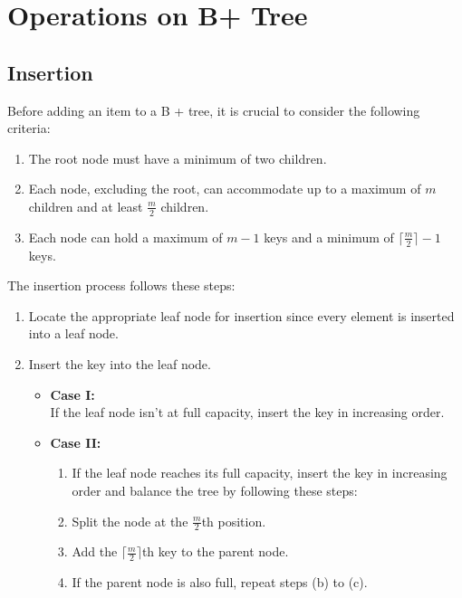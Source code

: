 \documentclass{article}
\begin{document}
\section{Operations on B+ Tree}
    \subsection{Insertion }
        Before adding an item to a B + tree, it is crucial to consider the following criteria: \begin{enumerate}
            \item The root node must have a minimum of two children.
            \item Each node, excluding the root, can accommodate up to a maximum         of $m$ children and at least $\frac{m}{2}$ children.
            \item Each node can hold a maximum of $m - 1$ keys and a minimum of $\lceil\frac{m}{2}\rceil - 1$ keys.
        \end{enumerate}
        \vspace{12pt}
        The insertion process follows these steps:
        \begin{enumerate}
            \item Locate the appropriate leaf node for insertion since every element is inserted into a leaf node.
            \item Insert the key into the leaf node.
           
           \begin{itemize}
               \item \textbf{Case I:}\\
                 If the leaf node isn't at full capacity, insert the key in increasing order.
           
               \item \textbf{Case II:}
                 \begin{enumerate}
                    \item If the leaf node reaches its full capacity, insert the key in  increasing order and balance the tree by following these steps:
                    \item Split the node at the $\frac{m}{2}$th position.
                    \item Add the $\lceil \frac{m}{2} \rceil$th key to the parent node.
                    \item If the parent node is also full, repeat steps (b) to (c).
                 \end{enumerate}
           \end{itemize}
        \end{enumerate}
\end{document}
